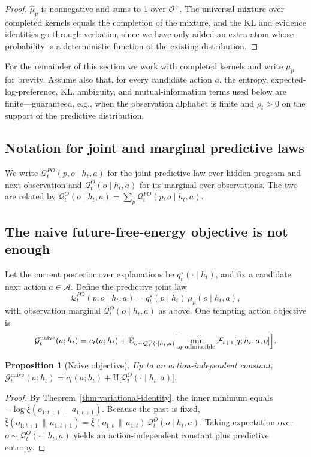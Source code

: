 \documentclass[11pt]{article}
\newtheorem{proposition}[definition]{Proposition}
\theoremstyle{remark}
\newcommand{\Acal}{\mathcal{A}}
\newcommand{\Ocal}{\mathcal{O}}
\newcommand{\Fcal}{\mathcal{F}}
\newcommand{\Gcal}{\mathcal{G}}
\newcommand{\Qcal}{\mathcal{Q}}
\newcommand{\E}{\mathbb{E}}
\newcommand{\Hh}{\mathrm{H}}
\newcommand{\givena}{\,\|\,}
\newcommand{\barxi}{\bar{\xi}}
\begin{document}
\begin{proof}
\(\hat\mu_p\) is nonnegative and sums to 1 over \(\Ocal^+\). The universal mixture over completed kernels equals the completion of the mixture, and the KL and evidence identities go through verbatim, since we have only added an extra atom whose probability is a deterministic function of the existing distribution.
\end{proof}

For the remainder of this section we work with completed kernels and write \(\mu_p\) for brevity. Assume also that, for every candidate action \(a\), the entropy, expected-log-preference, KL, ambiguity, and mutual-information terms used below are finite---guaranteed, e.g., when the observation alphabet is finite and \(\rho_t > 0\) on the support of the predictive distribution.

\subsection{Notation for joint and marginal predictive laws}

We write \(\Qcal_t^{PO}(p,o\mid h_t,a)\) for the joint predictive law over hidden program and next observation and \(\Qcal_t^O(o\mid h_t,a)\) for its marginal over observations. The two are related by \(\Qcal_t^O(o\mid h_t,a) = \sum_p \Qcal_t^{PO}(p,o\mid h_t,a)\).

\subsection{The naive future-free-energy objective is not enough}

Let the current posterior over explanations be \(q_t^\star(\cdot\mid h_t)\), and fix a candidate next action \(a\in\Acal\). Define the predictive joint law
\[
\Qcal_t^{PO}(p,o \mid h_t,a)
= q_t^\star(p\mid h_t)\,\mu_p(o\mid h_t,a),
\]
with observation marginal \(\Qcal_t^O(o \mid h_t,a)\) as above. One tempting action objective is
\[
\Gcal_t^{\mathrm{naive}}(a;h_t)
= c_t(a;h_t)
+ \E_{o\sim \Qcal_t^O(\cdot\mid h_t,a)}
\Bigl[\min_{q\ \mathrm{admissible}} \Fcal_{t+1}[q;h_t,a,o]\Bigr].
\]

\begin{proposition}[Naive objective]
Up to an action-independent constant,
\(
\Gcal_t^{\mathrm{naive}}(a;h_t)
= c_t(a;h_t) + \Hh\bigl[\Qcal_t^O(\cdot\mid h_t,a)\bigr].
\)
\end{proposition}

\begin{proof}
By Theorem~\ref{thm:variational-identity}, the inner minimum equals \(-\log \barxi(o_{1:t+1}\givena a_{1:t+1})\). Because the past is fixed, \(\barxi(o_{1:t+1}\givena a_{1:t+1}) = \barxi(o_{1:t}\givena a_{1:t})\,\Qcal_t^O(o\mid h_t,a)\). Taking expectation over \(o\sim \Qcal_t^O(\cdot\mid h_t,a)\) yields an action-independent constant plus predictive entropy.
\end{proof}
\end{document}
